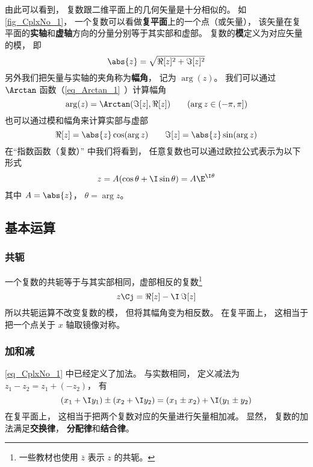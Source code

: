 由此可以看到， 复数跟二维平面上的几何矢量是十分相似的。 如\autoref{fig_CplxNo_1}， 一个复数可以看做\textbf{复平面}上的一个点（或矢量）， 该矢量在复平面的\textbf{实轴}和\textbf{虚轴}方向的分量分别等于其实部和虚部。 复数的\textbf{模}定义为对应矢量的模， 即
\begin{equation}
\abs{z} = \sqrt{\Re[z]^2 + \Im[z]^2}
\end{equation}
另外我们把矢量与实轴的夹角称为\textbf{幅角}， 记为 $\arg(z)$。 我们可以通过 $\Arctan$ 函数（\autoref{eq_Arctan_1}~）计算幅角
\begin{equation}\label{eq_CplxNo_5}
\arg(z) = \Arctan(\Im[z], \Re[z])
\qquad (\arg z \in (-\pi, \pi])
\end{equation}
也可以通过模和幅角来计算实部与虚部
\begin{equation}
\Re[z] = \abs{z}\cos(\arg z) \qquad \Im[z] = \abs{z}\sin(\arg z)
\end{equation}
在“指数函数（复数）” 中我们将看到， 任意复数也可以通过欧拉公式表示为以下形式
\begin{equation}
z = A(\cos\theta + \I\sin\theta) = A\E^{\I\theta}
\end{equation}
其中 $A = \abs{z}$， $\theta = \arg z$。

\subsection{基本运算}
\subsubsection{共轭}
一个复数的共轭等于与其实部相同，虚部相反的复数\footnote{一些教材也使用 $\bar z$ 表示 $z$ 的共轭。}
\begin{equation}\label{eq_CplxNo_6}
z\Cj = \Re[z] - \I\, \Im[z]
\end{equation}
所以共轭运算不改变复数的模， 但将其幅角变为相反数。 在复平面上， 这相当于把一个点关于 $x$ 轴取镜像对称。

\subsubsection{加和减}
\autoref{eq_CplxNo_1} 中已经定义了加法。 与实数相同， 定义减法为 $z_1 - z_2 = z_1 + (-z_2)$， 有
\begin{equation}
(x_1 + \I y_1) \pm (x_2 + \I y_2) = (x_1 \pm x_2) + \I (y_1 \pm y_2)
\end{equation}
在复平面上， 这相当于把两个复数对应的矢量进行矢量相加减。 显然， 复数的加法满足\textbf{交换律}， \textbf{分配律}和\textbf{结合律}。

